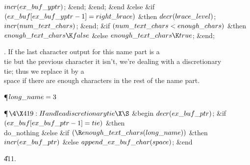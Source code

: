 $\\{incr}(\\{ex\_buf\_yptr})$;\6
\&{end};\2\6
\&{end};\2\2\6
\&{end}\6
\4\&{else} \&{if} $(\\{ex\_buf}[\\{ex\_buf\_yptr}-1]=\\{right\_brace})$ \1%
\&{then}\5
$\\{decr}(\\{brace\_level})$;\2\2\6
$\\{incr}(\\{num\_text\_chars})$;\6
\&{end};\2\6
\&{if} $(\\{num\_text\_chars}<\\{enough\_chars})$ \1\&{then}\5
$\\{enough\_text\_chars}\K\\{false}$\6
\4\&{else} $\\{enough\_text\_chars}\K\\{true}$;\2\6
\&{end};\par
\fi

.
If the last character output for this name part is a \\{tie} but the
previous character it isn't, we're dealing with a discretionary \\{tie};
thus we replace it by a \\{space} if there are enough characters in the
rest of the name part.

\Y\P\D {}$\\{long\_name}=3$\par
\Y\P$\4\X419:Handle a discretionary \\{tie}\X\S$\6
\&{begin} $\\{decr}(\\{ex\_buf\_ptr})$;\6
\&{if} $(\\{ex\_buf}[\\{ex\_buf\_ptr}-1]=\\{tie})$ \1\&{then}\6
\\{do\_nothing}\6
\4\&{else} \&{if} $(\R\\{enough\_text\_chars}(\\{long\_name}))$ \1\&{then}%
\6
$\\{incr}(\\{ex\_buf\_ptr})$\6
\4\&{else} \2\2\6
$\\{append\_ex\_buf\_char}(\\{space})$;\6
\&{end}\par
\U411.\fi

